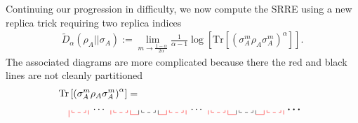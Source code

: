 \documentclass[a4paper,11pt]{article}
\newcommand{\Tr}{\text{Tr}}
\begin{document}
Continuing our progression in difficulty, we now compute the SRRE using a new replica trick requiring two replica indices
\begin{align}
    \tilde{D}_{\alpha}(\rho_A ||
    \sigma_A) := \lim_{m\rightarrow \frac{1-{\alpha}}{2{\alpha}}}\frac{1}{{\alpha} - 1}\log\left[ \Tr\left[ \left(\sigma_A^{m}\rho_A \sigma_A^{m} \right)^{{\alpha}}\right]\right] .
\end{align}
The associated diagrams are more complicated because there the red and black lines are not cleanly partitioned
\begin{align}
    \Tr &\left[ \left(\sigma_A^{m}\rho_A \sigma_A^{m}\right)^{\alpha}\right] =
    \nonumber
    \\
    &\tikz[scale=0.5,baseline=-0.5ex]{
    \draw[red, dashed] (0,0) -- (1,0);
    \draw[red] (0,0)-- (0,.15);
    \draw[red] (1,0)-- (1,.15);
    \draw[red] (-0.2,0.15)-- (-0.2,-0.35);
    \draw[red] (1.2,-0.15)-- (1.2,0.15);
    \draw[dashed,red] (3,0) -- (4,0);
    \draw[red] (3,0)-- (3,0.15);
    \draw[red] (4,0)-- (4,0.15);
    \draw[red] (2.8,-.15)-- (2.8,0.15);
    \draw[red] (4.2,-0.15)-- (4.2,0.15);
    \draw[dashed,black] (5,0) -- (6,0);
    \draw[black] (5,0)-- (5,0.15);
    \draw[black] (6,0)-- (6,0.15);
    \draw[black] (4.8,0.15)-- (4.8,-0.15);
    \draw[black] (6.2,-0.15)-- (6.2,0.15);
    \draw[dashed,red] (7,0) -- (8,0);
    \draw[red] (7,0)-- (7,0.15);
    \draw[red] (8,0)-- (8,0.15);
    \draw[red] (6.8,0.15)-- (6.8,-0.15);
    \draw[red] (8.2,-0.15)-- (8.2,0.15);
    \draw[dashed,red] (7+3,0) -- (8+3,0);
    \draw[red] (7+3,0)-- (7+3,0.15);
    \draw[red] (8+3,0)-- (8+3,0.15);
    \draw[red] (6.8+3,0.15)-- (6.8+3,-0.15);
    \draw[red] (8.2+3,-0.15)-- (8.2+3,0.15);
    \node[] at (2.,0.2) {$\cdots$};
    \node[] at (7+2.,0.2) {$\cdots$};
    \draw[red] (7-2+1.2,-0.15)--(7-2+1.8,-0.15);
    \draw[red] (7-4+1.2,-0.15)--(7-4+1.8,-0.15);
    \draw[dashed,black] (5+7,0) -- (6+7,0);
    \draw[black] (5+7,0)-- (5+7,0.15);
    \draw[black] (6+7,0)-- (6+7,0.15);
    \draw[black] (4.8+7,0.15)-- (4.8+7,-0.15);
    \draw[black] (6.2+7,-0.15)-- (6.2+7,0.15);
    \draw[dashed,red] (7+7,0) -- (8+7,0);
    \draw[red] (7+7,0)-- (7+7,0.15);
    \draw[red] (8+7,0)-- (8+7,0.15);
    \draw[red] (6.8+7,0.15)-- (6.8+7,-0.15);
    \draw[red] (8.2+7,-0.15)-- (8.2+7,0.15);
    \draw[red] (7+7-2+1.2,-0.15)--(7+7-2+1.8,-0.15);
    \draw[red] (7+7-4+1.2,-0.15)--(7+7-4+1.8,-0.15);
    \node[] at (2+14.,0.2) {$\boldsymbol{\cdots}$};
}
\end{align}
\end{document}
